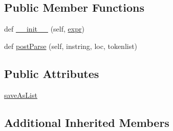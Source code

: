 \subsection*{Public Member Functions}
\begin{DoxyCompactItemize}
\item 
def \hyperlink{classpyparsing_1_1Dict_a4cbaea3fc512cb5ddfd608a671f62481}{\+\_\+\+\_\+init\+\_\+\+\_\+} (self, \hyperlink{classpyparsing_1_1ParseElementEnhance_a0139048279aeac38804a10d131d3c340}{expr})
\item 
def \hyperlink{classpyparsing_1_1Dict_a99c64e2caee00ebeb0fd12abe859180d}{post\+Parse} (self, instring, loc, tokenlist)
\end{DoxyCompactItemize}
\subsection*{Public Attributes}
\begin{DoxyCompactItemize}
\item 
\hyperlink{classpyparsing_1_1Dict_a4165522c7457c3690568e462306f9fdd}{save\+As\+List}
\end{DoxyCompactItemize}
\subsection*{Additional Inherited Members}


